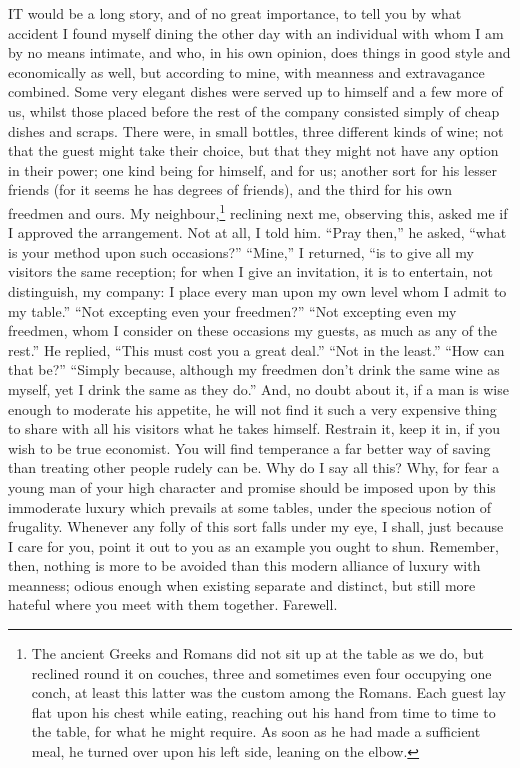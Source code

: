 IT would be a long story, and of no great importance, to tell you by what
accident I found myself dining the other day with an individual with whom
I am by no means intimate, and who, in his own opinion, does things in
good style and economically as well, but according to mine, with meanness
and extravagance combined. Some very elegant dishes were served up to
himself and a few more of us, whilst those placed before the rest of the
company consisted simply of cheap dishes and scraps. There were, in small
bottles, three different kinds of wine; not that the guest might take
their choice, but that they might not have any option in their power; one
kind being for himself, and for us; another sort for his lesser friends
(for it seems he has degrees of friends), and the third for his own
freedmen and ours. My neighbour,\footnote{The ancient Greeks and
Romans did not sit up at the table as we do, but reclined round it on
couches, three and sometimes even four occupying one conch, at least this
latter was the custom among the Romans. Each guest lay flat upon his chest
while eating, reaching out his hand from time to time to the table, for
what he might require. As soon as he had made a sufficient meal, he turned
over upon his left side, leaning on the elbow.} reclining next me,
observing this, asked me if I approved the arrangement. Not at all, I told
him. ``Pray then,'' he asked, ``what is your method upon such occasions?''
``Mine,'' I returned, ``is to give all my visitors the same reception; for
when I give an invitation, it is to entertain, not distinguish, my
company: I place every man upon my own level whom I admit to my table.''
``Not excepting even your freedmen?'' ``Not excepting even my freedmen, whom
I consider on these occasions my guests, as much as any of the rest.'' He
replied, ``This must cost you a great deal.'' ``Not in the least.'' ``How can
that be?'' ``Simply because, although my freedmen don't drink the same wine
as myself, yet I drink the same as they do.'' And, no doubt about it, if a
man is wise enough to moderate his appetite, he will not find it such a
very expensive thing to share with all his visitors what he takes himself.
Restrain it, keep it in, if you wish to be true economist. You will find
temperance a far better way of saving than treating other people rudely
can be. Why do I say all this? Why, for fear a young man of your high
character and promise should be imposed upon by this immoderate luxury
which prevails at some tables, under the specious notion of frugality.
Whenever any folly of this sort falls under my eye, I shall, just because
I care for you, point it out to you as an example you ought to shun.
Remember, then, nothing is more to be avoided than this modern alliance of
luxury with meanness; odious enough when existing separate and distinct,
but still more hateful where you meet with them together. Farewell.

